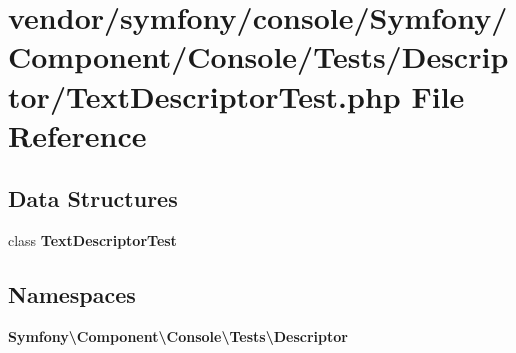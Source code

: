 \section{vendor/symfony/console/\+Symfony/\+Component/\+Console/\+Tests/\+Descriptor/\+Text\+Descriptor\+Test.php File Reference}
\label{_text_descriptor_test_8php}
\subsection*{Data Structures}
\begin{DoxyCompactItemize}
\item 
class {\bf Text\+Descriptor\+Test}
\end{DoxyCompactItemize}
\subsection*{Namespaces}
\begin{DoxyCompactItemize}
\item 
 {\bf Symfony\textbackslash{}\+Component\textbackslash{}\+Console\textbackslash{}\+Tests\textbackslash{}\+Descriptor}
\end{DoxyCompactItemize}
